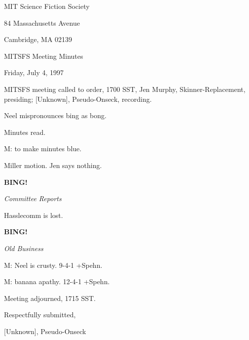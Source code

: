 \documentclass[12pt]{article}
\newcommand{\bing}{{\bf BING!} }
\newcommand{\goto}[1]{\bing \vskip 12pt \centerline{{\em{#1}}}}
\begin{document}
\begin{center}

MIT Science Fiction Society 

84 Massachusetts Avenue

Cambridge, MA 02139

\vspace{12pt}

MITSFS Meeting Minutes 

Friday, July 4, 1997

\end{center}
 
\vspace{18pt}

\setlength{\parskip}{6pt}

\noindent
MITSFS meeting called to order, 1700 SST,
Jen Murphy, Skinner-Replacement, presiding; [Unknown], Pseudo-Onseck, recording.

Neel mispronounces bing as bong.

Minutes read.

M: to make minutes blue.

Miller motion. Jen says nothing.

\goto{Committee Reports}

Hasslecomm is lost.

\goto{Old Business}

M: Neel is crusty. 9-4-1 +Spehn.

M: banana apathy. 12-4-1 +Spehn.

\vspace{12pt}

\noindent
Meeting adjourned, 1715 SST.

\vspace{18pt}

\centerline{Respectfully submitted,}
\centerline{[Unknown], Pseudo-Onseck}
\end{document}
